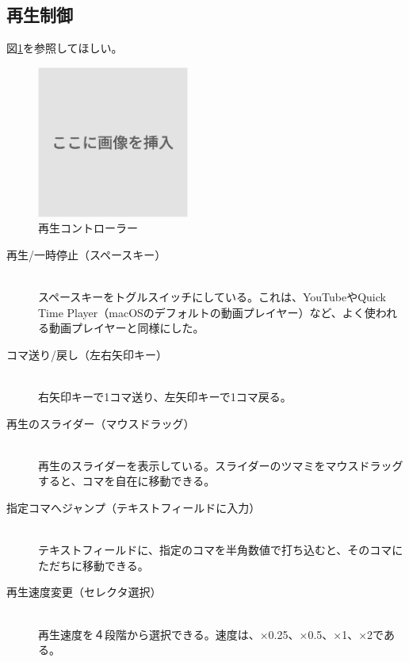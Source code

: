 \subsection{再生制御}

図\ref{fig:再生コントローラー}を参照してほしい。
\begin{figure}[h]
  \centering
  \includegraphics[width=5cm]{images/dummy.png}
  \caption{再生コントローラー}
  \label{fig:再生コントローラー}
\end{figure}


\begin{description}
  \item [再生/一時停止（スペースキー）]\mbox{}\\
  スペースキーをトグルスイッチにしている。これは、YouTubeやQuick Time Player（macOSのデフォルトの動画プレイヤー）など、よく使われる動画プレイヤーと同様にした。
  \item [コマ送り/戻し（左右矢印キー）]\mbox{}\\
  右矢印キーで1コマ送り、左矢印キーで1コマ戻る。
  \item [再生のスライダー（マウスドラッグ）]\mbox{}\\
  再生のスライダーを表示している。スライダーのツマミをマウスドラッグすると、コマを自在に移動できる。
  \item [指定コマへジャンプ（テキストフィールドに入力）]\mbox{}\\
  テキストフィールドに、指定のコマを半角数値で打ち込むと、そのコマにただちに移動できる。
  \item [再生速度変更（セレクタ選択）]\mbox{}\\
  再生速度を４段階から選択できる。速度は、×0.25、×0.5、×1、×2である。
\end{description}



